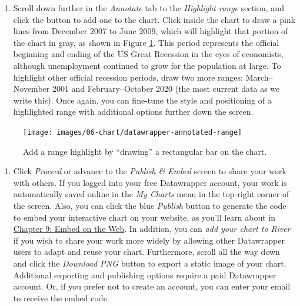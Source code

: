 \documentclass[
  english,
]{book}
\providecommand{\tightlist}{%
  \setlength{\itemsep}{0pt}\setlength{\parskip}{0pt}}
\begin{document}
\begin{enumerate}
\def\labelenumi{\arabic{enumi}.}
\setcounter{enumi}{7}
\tightlist
\item
  Scroll down further in the \emph{Annotate} tab to the \emph{Highlight range} section, and click the button to add one to the chart. Click inside the chart to draw a pink lines from December 2007 to June 2009, which will highlight that portion of the chart in gray, as shown in Figure \ref{fig:datawrapper-annotated-range}. This period represents the official beginning and ending of the US Great Recession in the eyes of economists, although unemployment continued to grow for the population at large. To highlight other official recession periods, draw two more ranges: March--November 2001 and February--October 2020 (the most current data as we write this). Once again, you can fine-tune the style and positioning of a highlighted range with additional options further down the screen.
\end{enumerate}



\begin{figure}
\texttt{[image: images/06-chart/datawrapper-annotated-range]} \caption{Add a range highlight by ``drawing'' a rectangular bar on the chart.}\label{fig:datawrapper-annotated-range}
\end{figure}

\begin{enumerate}
\def\labelenumi{\arabic{enumi}.}
\setcounter{enumi}{8}
\tightlist
\item
  Click \emph{Proceed} or advance to the \emph{Publish \& Embed} screen to share your work with others. If you logged into your free Datawrapper account, your work is automatically saved online in the \emph{My Charts} menu in the top-right corner of the screen. Also, you can click the blue \emph{Publish} button to generate the code to embed your interactive chart on your website, as you'll learn about in \href{embed.html}{Chapter 9: Embed on the Web}. In addition, you can \emph{add your chart to River} if you wish to share your work more widely by allowing other Datawrapper users to adapt and reuse your chart. Furthermore, scroll all the way down and click the \emph{Download PNG} button to export a static image of your chart. Additional exporting and publishing options require a paid Datawrapper account. Or, if you prefer not to create an account, you can enter your email to receive the embed code.
\end{enumerate}
\end{document}
